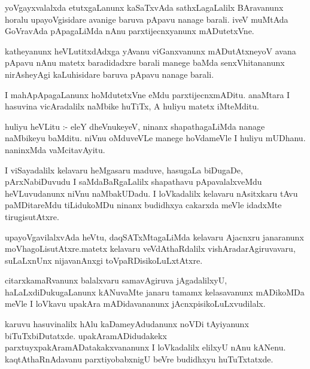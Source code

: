 \documentclass{article}
\begin{document}
\begin{mn}
yoVgayxvalalxda  etutxgaLanunx  kaSaTxvAda  sathxLagaLalilx  BAravanunx  horalu  
upayoVgisidare  avanige  baruva  pApavu  nanage  barali.  iveV  muMtAda  GoVravAda  
pApagaLiMda  nAnu  parxtijecnxyanunx  mADutetxVne.
\end{mn}

\begin{mn}
katheyanunx  heVLutitxdAdxga  yAvanu  viGanxvanunx  mADutAtxneyoV  avana  pApavu  
nAnu  matetx  baradidadxre  barali  manege  baMda  senxVhitananunx  nirAsheyAgi  
kaLuhisidare  baruva  pApavu  nanage  barali.
\end{mn}

\begin{mn}
I mahApApagaLanunx  hoMdutetxVne  eMdu  parxtijecnxmADitu.  anaMtara  I  
hasuvina  vicAradalilx  naMbike  huTiTx,  A  huliyu  matetx  iMteMditu.
\end{mn}

\begin{mn}
huliyu  heVLitu :- eleY  dheVnukeyeV,  ninanx  shapathagaLiMda  nanage  naMbikeyu  baMditu.  
niVnu  oMduveVLe  manege  hoVdameVle  I  huliyu  mUDhanu.  naninxMda  vaMcitavAyitu.
\end{mn}

\begin{mn}
I viSayadalilx  kelavaru  heMgasaru  maduve,  hasugaLa biDugaDe,  pArxNabiDuvudu  I  
saMdaBaRgaLalilx  shapathavu  pApavalalxveMdu  heVLuvudanunx  niVnu  naMbakUDadu.  I  
loVkadalilx  kelavaru  nAsitxkaru  tAvu  paMDitareMdu  tiLidukoMDu  ninanx  
budidhxya  cakarxda  meVle  idadxMte  tirugisutAtxre.
\end{mn}

\begin{mn}
upayoVgavilalxvAda  heVtu,  daqSATxMtagaLiMda  kelavaru  Ajacnxru  janaranunx  
moVhagoLisutAtxre.matetx  kelavaru  veVdAthaRdalilx  vishAradarAgiruvavaru,  
suLaLxnUnx  nijavanAnxgi  toVpaRDisikoLuLxtAtxre.
\end{mn}

\begin{mn}
citarxkamaRvanunx  balalxvaru  samavAgiruva  jAgadalilxyU,  haLaLxdiDukugaLanunx  
kANuvaMte  janaru  tamamx  kelasavanunx  mADikoMDa  meVle  I  loVkavu  
upakAra mADidavananunx  jAcnxpisikoLuLxvudilalx. 
\end{mn}

\begin{mn}
karuvu  hasuvinalilx  hAlu  kaDameyAdudanunx  noVDi  tAyiyanunx  biTuTxbiDutatxde.  
upakAramADidudakekx  parxtuyxpakAramADatakakxvananunx  I  loVkadalilx  elilxyU  
nAnu  kANenu.  kaqtAthaRnAdavanu  parxtiyobabxnigU  beVre  budidhxyu  huTuTxtatxde.
\end{mn}
\end{document}
